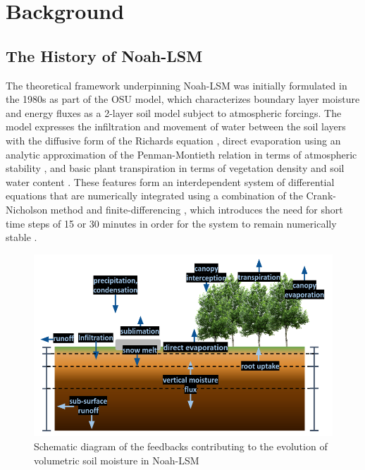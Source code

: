\documentclass[11pt]{article}
\begin{document}
\section{Background}

\begin{multicols}{2}

    \subsection{The History of Noah-LSM}

    The theoretical framework underpinning Noah-LSM was initially formulated in the 1980s as part of the OSU model, which characterizes boundary layer moisture and energy fluxes as a 2-layer soil model subject to atmospheric forcings. The model expresses the infiltration and movement of water between the soil layers with the diffusive form of the Richards equation \cite{mahrt_two-layer_1984}, direct evaporation using an analytic approximation of the Penman-Montieth relation in terms of atmospheric stability \cite{mahrt_influence_1984}, and basic plant transpiration in terms of vegetation density and soil water content \cite{pan_interaction_1987}. These features form an interdependent system of differential equations that are numerically integrated using a combination of the Crank-Nicholson method and finite-differencing \cite{chen_impact_1997}, which introduces the need for short time steps of 15 or 30 minutes in order for the system to remain numerically stable \cite{cartwright_dynamics_1992}\cite{mahrt_two-layer_1984}.

    \begin{figure}[H]
        \centering

        \includegraphics[width=.98\linewidth]{figs/noah-hydrology.png}

        \caption{Schematic diagram of the feedbacks contributing to the evolution of volumetric soil moisture in Noah-LSM}
        \label{feedback_schematic}
    \end{figure}

\end{multicols}
\end{document}
